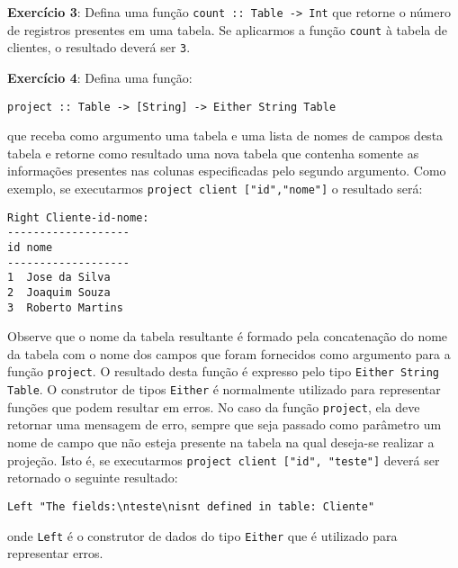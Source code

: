 \documentclass[11pt,a4paper]{report}
\begin{document}
\textbf{Exerc\'icio 3}: Defina uma fun\c{c}\~ao \texttt{count :: Table -> Int} que retorne o n\'umero de registros
presentes em uma tabela. Se aplicarmos a fun\c{c}\~ao \texttt{count} \`a tabela de clientes, o resultado dever\'a ser
\texttt{3}.

\textbf{Exerc\'icio 4}: Defina uma fun\c{c}\~ao:
\begin{center}
 \texttt{project :: Table -> [String] -> Either String Table}
\end{center}

que receba como argumento uma tabela e uma lista de nomes de campos desta tabela e retorne como resultado uma nova 
tabela que contenha somente as informa\c{c}\~oes presentes nas colunas especificadas pelo segundo argumento. Como 
exemplo, se executarmos \texttt{project client ["id","nome"]} o resultado ser\'a:
\begin{verbatim}
Right Cliente-id-nome:
-------------------
id nome            
-------------------
1  Jose da Silva   
2  Joaquim Souza   
3  Roberto Martins
\end{verbatim}

Observe que o nome da tabela resultante \'e formado pela concatena\c{c}\~ao do nome da tabela com o nome dos campos 
que foram fornecidos como argumento para a fun\c{c}\~ao \texttt{project}. O resultado desta fun\c{c}\~ao \'e expresso
pelo tipo \texttt{Either String Table}. O construtor de tipos \texttt{Either} \'e normalmente utilizado para representar
fun\c{c}\~oes que podem resultar em erros. No caso da fun\c{c}\~ao \texttt{project}, ela deve retornar uma mensagem de
erro, sempre que seja passado como par\^ametro um nome de campo que n\~ao esteja presente na tabela na qual deseja-se
realizar a proje\c{c}\~ao. Isto \'e, se executarmos \texttt{project client ["id", "teste"]} dever\'a ser retornado o
seguinte resultado:
\begin{verbatim}
Left "The fields:\nteste\nisnt defined in table: Cliente"
\end{verbatim}
onde \texttt{Left} \'e o construtor de dados do tipo \texttt{Either} que \'e utilizado para representar erros.
\end{document}
